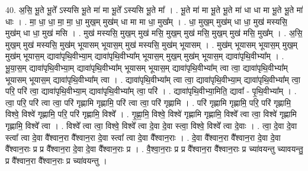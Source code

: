 \documentclass[17pt]{extarticle}
\begin{document}
40. अ॒सि॒ भू॒ते भू॒ते᳚ ऽस्यसि भू॒ते मा॑ मा भू॒ते᳚ ऽस्यसि भू॒ते मा᳚ । . भू॒ते मा॑ मा भू॒ते भू॒ते मा॑ धा धा मा भू॒ते भू॒ते मा॑ धाः । . मा॒ धा॒ धा॒ मा॒ मा॒ धा॒ मुख॒म् मुख॑म् धा मा मा धा॒ मुख᳚म् । . धा॒ मुख॒म् मुख॑म् धा धा॒ मुख॑ मस्यसि॒ मुख॑म् धा धा॒ मुख॑ मसि । . मुख॑ मस्यसि॒ मुख॒म् मुख॑ मसि॒ मुख॒म् मुख॑ मसि॒ मुख॒म् मुख॑ मसि॒ मुख᳚म् । . अ॒सि॒ मुख॒म् मुख॑ मस्यसि॒ मुख॑म् भूयासम् भूयास॒म् मुख॑ मस्यसि॒ मुख॑म् भूयासम् । . मुख॑म् भूयासम् भूयास॒म् मुख॒म् मुख॑म् भूयास॒म् द्यावा॑पृथि॒वीभ्या॒म् द्यावा॑पृथि॒वीभ्या᳚म् भूयास॒म् मुख॒म् मुख॑म् भूयास॒म् द्यावा॑पृथि॒वीभ्या᳚म् । . भू॒या॒स॒म् द्यावा॑पृथि॒वीभ्या॒म् द्यावा॑पृथि॒वीभ्या᳚म् भूयासम् भूयास॒म् द्यावा॑पृथि॒वीभ्या᳚म् त्वा त्वा॒ द्यावा॑पृथि॒वीभ्या᳚म् भूयासम् भूयास॒म् द्यावा॑पृथि॒वीभ्या᳚म् त्वा । . द्यावा॑पृथि॒वीभ्या᳚म् त्वा त्वा॒ द्यावा॑पृथि॒वीभ्या॒म् द्यावा॑पृथि॒वीभ्या᳚म् त्वा॒ परि॒ परि॑ त्वा॒ द्यावा॑पृथि॒वीभ्या॒म् द्यावा॑पृथि॒वीभ्या᳚म् त्वा॒ परि॑ । . द्यावा॑पृथि॒वीभ्या॒मिति॒ द्यावा᳚ - पृ॒थि॒वीभ्या᳚म् । . त्वा॒ परि॒ परि॑ त्वा त्वा॒ परि॑ गृह्णामि गृह्णामि॒ परि॑ त्वा त्वा॒ परि॑ गृह्णामि । . परि॑ गृह्णामि गृह्णामि॒ परि॒ परि॑ गृह्णामि॒ विश्वे॒ विश्वे॑ गृह्णामि॒ परि॒ परि॑ गृह्णामि॒ विश्वे᳚ । . गृ॒ह्णा॒मि॒ विश्वे॒ विश्वे॑ गृह्णामि गृह्णामि॒ विश्वे᳚ त्वा त्वा॒ विश्वे॑ गृह्णामि गृह्णामि॒ विश्वे᳚ त्वा । . विश्वे᳚ त्वा त्वा॒ विश्वे॒ विश्वे᳚ त्वा दे॒वा दे॒वा स्त्वा॒ विश्वे॒ विश्वे᳚ त्वा दे॒वाः । . त्वा॒ दे॒वा दे॒वा स्त्वा᳚ त्वा दे॒वा वै᳚श्वान॒रा वै᳚श्वान॒रा दे॒वा स्त्वा᳚ त्वा दे॒वा वै᳚श्वान॒राः । . दे॒वा वै᳚श्वान॒रा वै᳚श्वान॒रा दे॒वा दे॒वा वै᳚श्वान॒राः प्र प्र वै᳚श्वान॒रा दे॒वा दे॒वा वै᳚श्वान॒राः प्र । . वै॒श्वा॒न॒राः प्र प्र वै᳚श्वान॒रा वै᳚श्वान॒राः प्र च्या॑वयन्तु च्यावयन्तु॒ प्र वै᳚श्वान॒रा वै᳚श्वान॒राः प्र च्या॑वयन्तु । \newline
\pagebreak
{}
\end{document}
